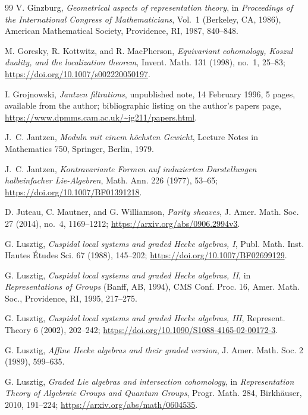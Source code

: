 \documentclass[11pt]{amsart}
\theoremstyle{definition}
\theoremstyle{remark}
\begin{document}
\begin{thebibliography}{99}
V. Ginzburg, \emph{Geometrical aspects of representation theory},
in \emph{Proceedings of the International Congress of Mathematicians},
Vol.~1 (Berkeley, CA, 1986), American Mathematical Society, Providence, RI,
1987, 840--848.

M. Goresky, R. Kottwitz, and R. MacPherson,
\emph{Equivariant cohomology, Koszul duality, and the localization theorem},
Invent. Math. 131 (1998), no.~1, 25--83;
\url{https://doi.org/10.1007/s002220050197}.

I. Grojnowski, \emph{Jantzen filtrations}, unpublished note,
14 February 1996, 5 pages, available from the author; bibliographic listing
on the author's papers page,
\url{https://www.dpmms.cam.ac.uk/~ig211/papers.html}.

J.~C. Jantzen, \emph{Moduln mit einem h\"ochsten Gewicht},
Lecture Notes in Mathematics 750, Springer, Berlin, 1979.

J.~C. Jantzen,
\emph{Kontravariante Formen auf induzierten Darstellungen halbeinfacher
Lie-Algebren}, Math. Ann. 226 (1977), 53--65;
\url{https://doi.org/10.1007/BF01391218}.

D. Juteau, C. Mautner, and G. Williamson, \emph{Parity sheaves},
J. Amer. Math. Soc. 27 (2014), no.~4, 1169--1212;
\url{https://arxiv.org/abs/0906.2994v3}.

G. Lusztig, \emph{Cuspidal local systems and graded Hecke algebras, I},
Publ. Math. Inst. Hautes \'Etudes Sci. 67 (1988), 145--202;
\url{https://doi.org/10.1007/BF02699129}.

G. Lusztig, \emph{Cuspidal local systems and graded Hecke algebras, II},
in \emph{Representations of Groups} (Banff, AB, 1994),
CMS Conf. Proc. 16, Amer. Math. Soc., Providence, RI, 1995, 217--275.

G. Lusztig, \emph{Cuspidal local systems and graded Hecke algebras, III},
Represent. Theory 6 (2002), 202--242;
\url{https://doi.org/10.1090/S1088-4165-02-00172-3}.

G. Lusztig, \emph{Affine Hecke algebras and their graded version},
J. Amer. Math. Soc. 2 (1989), 599--635.

G. Lusztig, \emph{Graded Lie algebras and intersection cohomology},
in \emph{Representation Theory of Algebraic Groups and Quantum Groups},
Progr. Math. 284, Birkh\"auser, 2010, 191--224;
\url{https://arxiv.org/abs/math/0604535}.


\end{thebibliography}
\end{document}
